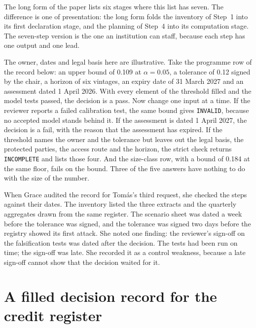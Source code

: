 The long form of the paper lists six stages where this list has seven. The
difference is one of presentation: the long form folds the inventory of Step~1 into
its first declaration stage, and the planning of Step~4 into its computation stage.
The seven-step version is the one an institution can staff, because each step has
one output and one lead.

\begin{example}\label{c16:ex-five}
The owner, dates and legal basis here are illustrative. Take the programme row of the
record below: an upper bound of 0.109 at $\alpha = 0.05$, a tolerance of 0.12 signed by
the chair, a horizon of six vintages, an expiry date of 31 March 2027 and an assessment
dated 1 April 2026. With every element of the threshold filled and the model tests
passed, the decision is a pass. Now change one input at a time. If the reviewer reports a
failed calibration test, the same bound gives \texttt{INVALID}, because no accepted model
stands behind it. If the assessment is dated 1 April 2027, the decision is a fail, with
the reason that the assessment has expired. If the threshold names the owner and the
tolerance but leaves out the legal basis, the protected parties, the access route and the
horizon, the strict check returns \texttt{INCOMPLETE} and lists those four. And the
size-class row, with a bound of 0.184 at the same floor, fails on the bound. Three of the
five answers have nothing to do with the size of the number.
\end{example}


When Grace audited the record for Tomás's third request, she checked the steps
against their dates. The inventory listed the three extracts and the quarterly
aggregates drawn from the same register. The scenario sheet was dated a week before
the tolerance was signed, and the tolerance was signed two days before the registry
showed its first attack. She noted one finding: the reviewer's sign-off on the
falsification tests was dated after the decision. The tests had been run on time;
the sign-off was late. She recorded it as a control weakness, because a late
sign-off cannot show that the decision waited for it.

\section{A filled decision record for the credit register}


